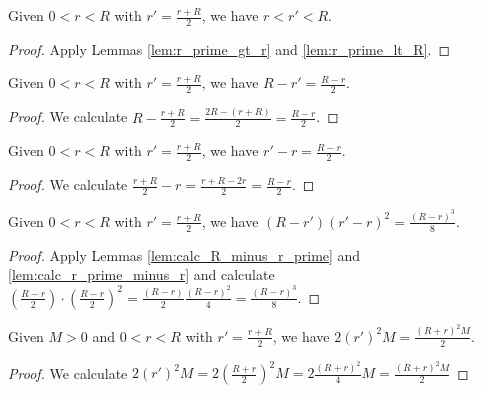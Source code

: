 
\begin{lemma}\label{lem:r_prime_is_intermediate} \leanok
Given $0 < r < R$ with $r'=\frac{r+R}{2}$, we have $r < r' < R$.
\end{lemma}
\begin{proof}\leanok
{}
Apply Lemmas \ref{lem:r_prime_gt_r} and \ref{lem:r_prime_lt_R}.
\end{proof}



\begin{lemma}\label{lem:calc_R_minus_r_prime} \leanok
Given $0 < r < R$ with $r'=\frac{r+R}{2}$, we have $R-r' = \frac{R-r}{2}$.
\end{lemma}
\begin{proof}\leanok
We calculate $R - \frac{r+R}{2} = \frac{2R - (r+R)}{2} = \frac{R-r}{2}$.
\end{proof}


\begin{lemma}\label{lem:calc_r_prime_minus_r} \leanok
Given $0 < r < R$ with $r'=\frac{r+R}{2}$, we have $r'-r = \frac{R-r}{2}$.
\end{lemma}
\begin{proof}\leanok
We calculate $\frac{r+R}{2} - r = \frac{r+R - 2r}{2} = \frac{R-r}{2}$.
\end{proof}


\begin{lemma}\label{lem:calc_denominator_specific} \leanok
Given $0 < r < R$ with $r'=\frac{r+R}{2}$, we have $(R-r')(r'-r)^2 = \frac{(R-r)^3}{8}$.
\end{lemma}
\begin{proof}\leanok
{}
Apply Lemmas \ref{lem:calc_R_minus_r_prime} and \ref{lem:calc_r_prime_minus_r} and calculate $\left(\frac{R-r}{2}\right) \cdot \left(\frac{R-r}{2}\right)^2 = \frac{(R-r)}{2}\frac{(R-r)^2}{4} = \frac{(R-r)^3}{8}$.
\end{proof}



\begin{lemma}\label{lem:calc_numerator_specific} \leanok
Given $M>0$ and $0 < r < R$ with $r'=\frac{r+R}{2}$, we have $2(r')^2M = \frac{(R+r)^2 M}{2}$.
\end{lemma}
\begin{proof}\leanok
We calculate $2(r')^2M = 2\left(\frac{R+r}{2}\right)^2M = 2\frac{(R+r)^2}{4}M =\frac{(R+r)^2 M}{2}$
\end{proof}

